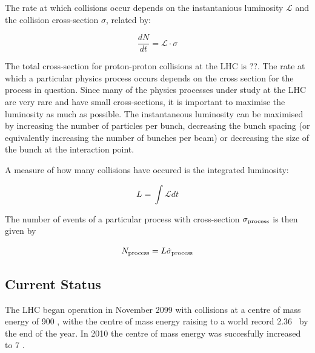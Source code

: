 The rate at which collisions occur depends on the instantanious luminosity
$\mathcal{L}$ and the collision cross-section $\sigma$, related by:

\begin{equation}
\frac{dN}{dt} = \mathcal{L} \cdot \sigma
\end{equation}

The total cross-section for
proton-proton collisions at the LHC is ??. The rate at which a particular
physics process occurs depends on the cross section for the process in question.
Since many of the physics processes under study at the LHC are very rare and
have small cross-sections, it is important to maximise the luminosity as much as
possible.  The instantaneous luminosity can be maximised by increasing the
number of particles per bunch, decreasing the bunch spacing (or equivalently
increasing the number of bunches per beam) or decreasing the size of the bunch
at the interaction point.


%

A measure of how many collisions have occured is the integrated luminosity:

\begin{equation}
L = \int \mathcal{L} dt
\end{equation}

The number of events of a particular process with cross-section
$\sigma_{\rm{process}}$ is then given by

\begin{equation}
N_{\rm{process}} = L \dot \sigma_{\rm{process}}
\end{equation}

\subsection{Current Status}

The LHC began operation in November 2099 with collisions at a centre of mass
energy of 900 \GeV, withe the centre of mass energy raising to a world record
2.36 \TeV\ by the end of the year. In 2010 the centre of mass energy was
succesfully increased to 7 \TeV.

